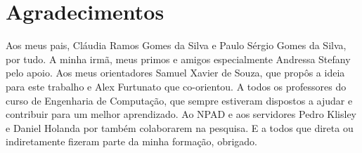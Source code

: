 
\chapter*{Agradecimentos}
Aos meus pais, Cláudia Ramos Gomes da Silva e Paulo Sérgio Gomes da Silva, por tudo. A minha irmã, meus primos e amigos especialmente Andressa Stefany pelo apoio. Aos meus orientadores Samuel Xavier de Souza, que propôs a ideia para este trabalho e Alex Furtunato que co-orientou. A todos os professores do curso de Engenharia de Computação, que sempre estiveram dispostos a ajudar e contribuir para um melhor aprendizado. Ao NPAD e aos servidores Pedro Klisley e Daniel Holanda por também colaborarem na pesquisa. E a todos que direta ou indiretamente fizeram parte da minha formação, obrigado.